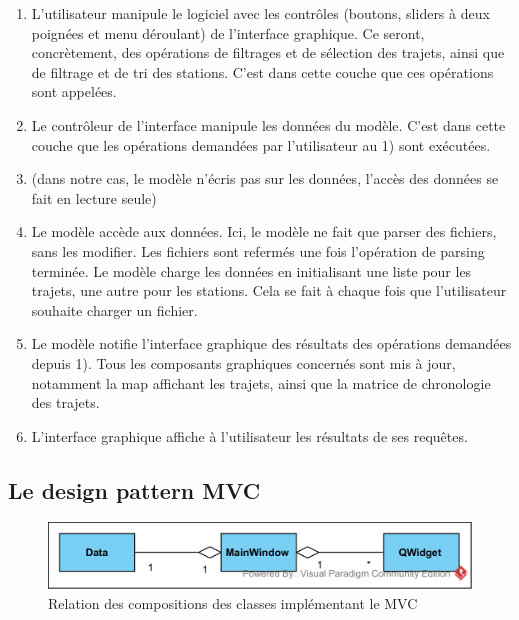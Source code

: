 \documentclass[12pt]{article}
\begin{document}
		\begin{enumerate}
		\item L'utilisateur manipule le logiciel avec les contrôles (boutons, sliders à deux
		poignées et menu déroulant) de l’interface graphique. Ce seront, concrètement,
		des opérations de filtrages et de sélection des trajets, ainsi que de filtrage
		et de tri des stations. C’est dans cette couche que ces opérations sont appelées.\\
		
		\item Le contrôleur de l’interface manipule les données du modèle. C’est dans cette
		couche que les opérations demandées par l’utilisateur au 1) sont exécutées.\\
		
		\item (dans notre cas, le modèle n’écris pas sur les données, l’accès des données se
		fait en lecture seule)\\
		
		\item Le modèle accède aux données. Ici, le modèle ne fait que parser des fichiers,
		sans les modifier. Les fichiers sont refermés une fois l’opération de parsing
		terminée. Le modèle charge les données en initialisant une liste pour les trajets,
		une autre pour les stations. Cela se fait à chaque fois que l’utilisateur
		souhaite charger un fichier.\\
		
		\item Le modèle notifie l’interface graphique des résultats des opérations demandées
		depuis 1). Tous les composants graphiques concernés sont mis à jour, notamment la
		map affichant les trajets, ainsi que la matrice de chronologie des trajets.\\
		
		\item L’interface graphique affiche à l'utilisateur les résultats de ses requêtes.\\
		\end{enumerate}

		\subsection{Le design pattern MVC}		
		\begin{figure}[!h]
		\begin{center}
		\includegraphics[scale=1]{dia_class_mvc.png}
		\caption{Relation des compositions des classes implémentant le MVC}
		\end{center}
		\end{figure}		
		
\end{document}
